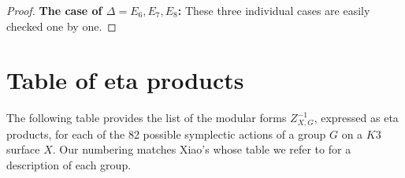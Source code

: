 \documentclass{amsart}
\theoremstyle{definition}
\begin{document}
\begin{proof}
\textbf{The case of $\Delta =E_{6},E_{7},E_{8}$:} These three
individual cases are easily checked one by one.

    
\end{proof}



\clearpage

\section{Table of eta products}\label{app:tableeta}
\renewcommand{\arraystretch}{1.5}



The following table provides the list of the modular forms
$Z_{X,G}^{-1}$, expressed as eta products, for each of the 82 possible
symplectic actions of a group $G$ on a $K3$ surface $X$. Our numbering
matches Xiao's \cite{xiao1996galois} whose table we refer to for a
description of each group.
\end{document}
